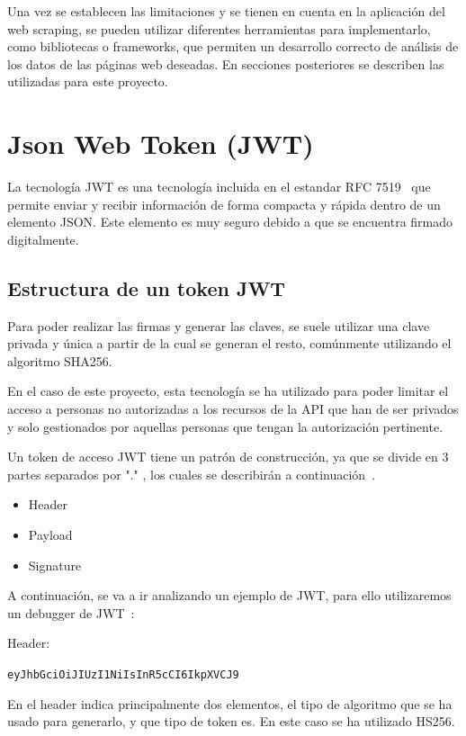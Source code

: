 Una vez se establecen las limitaciones y se tienen en cuenta en la aplicación del web scraping, se pueden utilizar diferentes herramientas para implementarlo, como bibliotecas o frameworks, que permiten un desarrollo correcto de análisis de los datos de las páginas web deseadas. En secciones posteriores se describen las utilizadas para este proyecto.


\section{Json Web Token (JWT)}
La tecnología JWT es una tecnología incluida en el estandar RFC 7519~\cite{JWT_Estandar} que permite enviar y recibir información de forma compacta y rápida dentro de un elemento JSON. Este elemento es muy seguro debido a que se encuentra firmado digitalmente.

\subsection{Estructura de un token JWT}
Para poder realizar las firmas y generar las claves, se suele utilizar una clave privada y única a partir de la cual se generan el resto, comúnmente utilizando el algoritmo SHA256.

En el caso de este proyecto, esta tecnología se ha utilizado para poder limitar el acceso a personas no autorizadas a los recursos de la API que han de ser privados y solo gestionados por aquellas personas que tengan la autorización pertinente.

Un token de acceso JWT tiene un patrón de construcción, ya que se divide en 3 partes separados por "." , los cuales se describirán a continuación~\cite{JWT_Info}.
\begin{itemize}
    \item Header
    \item Payload
    \item Signature
\end{itemize}

A continuación, se va a ir analizando un ejemplo de JWT, para ello utilizaremos un debugger de JWT~\cite{JWT_Debugger}:

Header:

\texttt{eyJhbGciOiJIUzI1NiIsInR5cCI6IkpXVCJ9}

En el header indica principalmente dos elementos, el tipo de algoritmo que se ha usado para generarlo, y que tipo de token es. En este caso se ha utilizado HS256.

